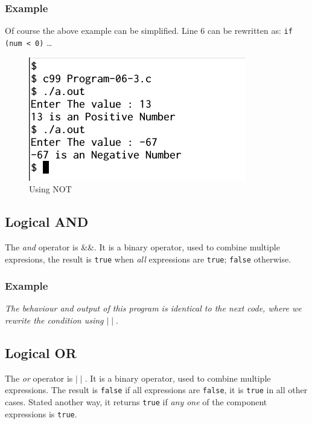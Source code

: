 \documentclass[11pt,a4paper]{article}
\begin{document}
\subsubsection*{Example}


Of course the above example can be simplified. Line 6 can be rewritten as: \texttt{if (num < 0)} \ldots

\begin{figure}[ht]
\begin{center}
\includegraphics[scale=0.6]{Output-06-3.png}
\caption{Using NOT}
\label{output-06-3}
\end{center}
\end{figure}

\subsection*{Logical AND}
The \emph{and} operator is \&\&. It is a binary operator, used to combine multiple expresions, the result is \texttt{true} when \emph{all} expressions are \texttt{true}; \texttt{false} otherwise.

\subsubsection*{Example}


\emph{The behaviour and output of this program is identical to the next code, where we rewrite the condition using $\mid\mid$}.

\subsection*{Logical OR} 
The \emph{or} operator is $\mid\mid$. It is a binary operator, used to combine multiple expressions. The result is \texttt{false} if all expressions are \texttt{false}, it is \texttt{true} in all other cases. Stated another way, it returns \texttt{true} if \emph{any one} of the component expressions is \texttt{true}.
\end{document}
